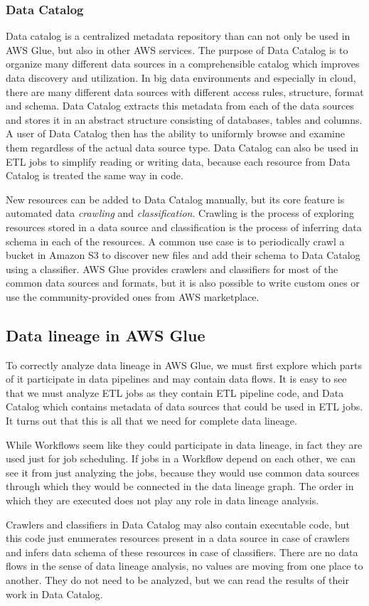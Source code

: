 \subsubsection{Data Catalog}
Data catalog is a centralized metadata repository than can not only be used in AWS Glue, but also in other AWS services. The purpose of Data Catalog is to organize many different data sources in a comprehensible catalog which improves data discovery and utilization. In big data environments and especially in cloud, there are many different data sources with different access rules, structure, format and schema. Data Catalog extracts this metadata from each of the data sources and stores it in an abstract structure consisting of databases, tables and columns. A user of Data Catalog then has the ability to uniformly browse and examine them regardless of the actual data source type. Data Catalog can also be used in ETL jobs to simplify reading or writing data, because each resource from Data Catalog is treated the same way in code.
\par
New resources can be added to Data Catalog manually, but its core feature is automated data \textit{crawling} and \textit{classification}. Crawling is the process of exploring resources stored in a data source and classification is the process of inferring data schema in each of the resources. A common use case is to periodically crawl a bucket in Amazon S3 to discover new files and add their schema to Data Catalog using a classifier. AWS Glue provides crawlers and classifiers for most of the common data sources and formats, but it is also possible to write custom ones or use the community-provided ones from AWS marketplace.

\subsection{Data lineage in AWS Glue}
To correctly analyze data lineage in AWS Glue, we must first explore which parts of it participate in data pipelines and may contain data flows. It is easy to see that we must analyze ETL jobs as they contain ETL pipeline code, and Data Catalog which contains metadata of data sources that could be used in ETL jobs. It turns out that this is all that we need for complete data lineage.
\par
While Workflows seem like they could participate in data lineage, in fact they are used just for job scheduling. If jobs in a Workflow depend on each other, we can see it from just analyzing the jobs, because they would use common data sources through which they would be connected in the data lineage graph. The order in which they are executed does not play any role in data lineage analysis.
\par
Crawlers and classifiers in Data Catalog may also contain executable code, but this code just enumerates resources present in a data source in case of crawlers and infers data schema of these resources in case of classifiers. There are no data flows in the sense of data lineage analysis, no values are moving from one place to another. They do not need to be analyzed, but we can read the results of their work in Data Catalog.


